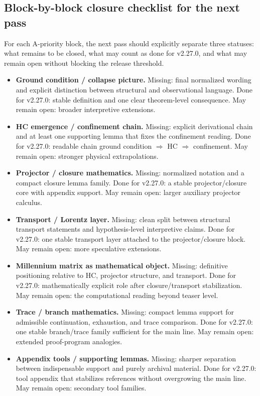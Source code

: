 \subsection*{Block-by-block closure checklist for the next pass}
For each A-priority block, the next pass should explicitly separate three statuses: what remains to be closed, what may count as done for v2.27.0, and what may remain open without blocking the release threshold.

\begin{itemize}
    \item \textbf{Ground condition / collapse picture.} Missing: final normalized wording and explicit distinction between structural and observational language. Done for v2.27.0: stable definition and one clear theorem-level consequence. May remain open: broader interpretive extensions.
    \item \textbf{HC emergence / confinement chain.} Missing: explicit derivational chain and at least one supporting lemma that fixes the confinement reading. Done for v2.27.0: readable chain ground condition $\Rightarrow$ HC $\Rightarrow$ confinement. May remain open: stronger physical extrapolations.
    \item \textbf{Projector / closure mathematics.} Missing: normalized notation and a compact closure lemma family. Done for v2.27.0: a stable projector/closure core with appendix support. May remain open: larger auxiliary projector calculus.
    \item \textbf{Transport / Lorentz layer.} Missing: clean split between structural transport statements and hypothesis-level interpretive claims. Done for v2.27.0: one stable transport layer attached to the projector/closure block. May remain open: more speculative extensions.
    \item \textbf{Millennium matrix as mathematical object.} Missing: definitive positioning relative to HC, projector structure, and transport. Done for v2.27.0: mathematically explicit role after closure/transport stabilization. May remain open: the computational reading beyond teaser level.
    \item \textbf{Trace / branch mathematics.} Missing: compact lemma support for admissible continuation, exhaustion, and trace comparison. Done for v2.27.0: one stable branch/trace family sufficient for the main line. May remain open: extended proof-program analogies.
    \item \textbf{Appendix tools / supporting lemmas.} Missing: sharper separation between indispensable support and purely archival material. Done for v2.27.0: tool appendix that stabilizes references without overgrowing the main line. May remain open: secondary tool families.
\end{itemize}

